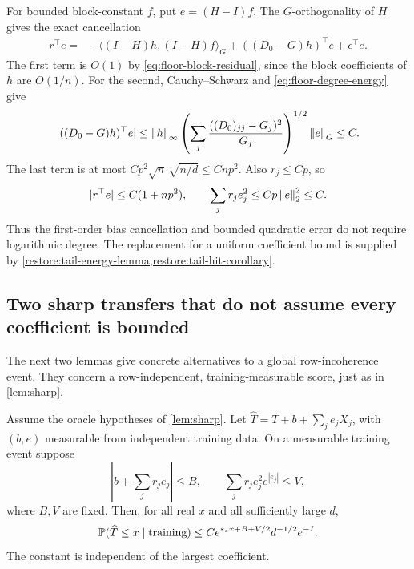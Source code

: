 For bounded block-constant $f$, put $e=(H-I)f$. The
$G$-orthogonality of $H$ gives the exact cancellation
\begin{align}
 r^\top e
 ={}&-\langle(I-H)h,(I-H)f\rangle_G
       +((D_0-G)h)^\top e+\epsilon^\top e.
       \label{eq:floor-tilted-cancellation}
\end{align}
The first term is $O(1)$ by \eqref{eq:floor-block-residual}, since
the block coefficients of $h$ are $O(1/n)$. For the second,
Cauchy--Schwarz and \eqref{eq:floor-degree-energy} give
\[
 |((D_0-G)h)^\top e|
 \le \left\lVert h\right\rVert_\infty
 \left(\sum_j\frac{((D_0)_{jj}-G_j)^2}{G_j}\right)^{1/2}
 \left\lVert e\right\rVert_G
 \le C.
\]
The last term is at most
$Cp^2\sqrt n\,\sqrt{n/d}\le Cnp^2$. Also $r_j\le Cp$, so
\begin{equation}\label{eq:floor-tilt-moments}
 |r^\top e|\le C(1+np^2),\qquad
 \sum_jr_je_j^2\le Cp\left\lVert e\right\rVert_2^2\le C.
\end{equation}
Thus the first-order bias cancellation and bounded quadratic error do
not require logarithmic degree. The replacement for a uniform
coefficient bound is supplied by
\cref{restore:tail-energy-lemma,restore:tail-hit-corollary}.

\subsection{Two sharp transfers that do not assume every coefficient is bounded}

The next two lemmas give concrete alternatives to a global
row-incoherence event. They concern a row-independent, training-measurable
score, just as in \cref{lem:sharp}.

\begin{lemma}\label{lem:sparse-exp-transfer}
Assume the oracle hypotheses of \cref{lem:sharp}. Let
$\widehat T=T+b+\sum_je_jX_j$, with $(b,e)$ measurable from independent
training data. On a measurable training event suppose
\[
 \left|b+\sum_jr_je_j\right|\le B,\qquad
 \sum_jr_je_j^2e^{|e_j|}\le V,
\]
where $B,V$ are fixed. Then, for all real $x$ and all sufficiently
large $d$,
\[
 \mathbb P(\widehat T\le x\mid\text{training})
 \le C e^{s_*x+B+V/2}d^{-1/2}e^{-I}.
\]
The constant is independent of the largest coefficient.
\end{lemma}

